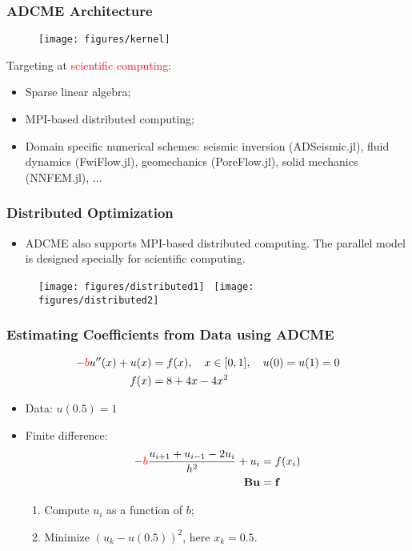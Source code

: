 \documentclass[usenames,dvipsnames]{beamer}
\begin{document}
\begin{frame}
	\frametitle{ADCME Architecture}
	
	\begin{figure}[hbt]
		\centering
  \texttt{[image: figures/kernel]}
\end{figure}
\vspace{-1.0cm}
Targeting at \textcolor{red}{scientific computing}: 
\begin{itemize}
	\item Sparse linear algebra;
	\item MPI-based distributed computing;
	\item Domain specific numerical schemes: seismic inversion (ADSeismic.jl), fluid dynamics (FwiFlow.jl), geomechanics (PoreFlow.jl), solid mechanics (NNFEM.jl), $\ldots$
\end{itemize}
\end{frame}

\begin{frame}
	\frametitle{Distributed Optimization}
	\begin{itemize}
		\item ADCME also supports MPI-based distributed computing. The parallel model is designed specially for scientific computing. 
	\end{itemize}
	\begin{figure}[hbt]
		\centering
  \texttt{[image: figures/distributed1]}~
  \texttt{[image: figures/distributed2]}
\end{figure}
\end{frame}

\begin{frame}
	\frametitle{Estimating Coefficients from Data using ADCME}
	
	\begin{align*}
		-\textcolor{red}{b} u''(x) + u(x) &= f(x), \quad x\in [0,1], \quad u(0) = u(1) = 0\\ 
		f(x) &= 8+4x-4x^2
	\end{align*}
	
	
	\begin{itemize}
		\item Data: $u(0.5)=1$
		\item Finite difference:
		\begin{align*}
			-\textcolor{red}{b}\frac{u_{i+1} + u_{i-1} - 2u_i}{h^2} + u_i &= f(x_i)\\
			\mathbf{B} \mathbf{u} &= \mathbf{f}
		\end{align*}
		\begin{enumerate}
			\item Compute $u_i$ as a function of $b$;
			\item Minimize $(u_k - u(0.5))^2$, here $x_k = 0.5$.
		\end{enumerate}
	\end{itemize}
	
\end{frame}
\end{document}
